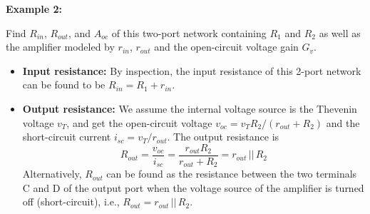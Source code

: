 \begin{itemize}
\begin{itemize}
  \begin{comment}
  The performance of such a circuit containing active components can also
  be described by terms such as ``voltage gain'' $G_V$, ``current gain'' 
  $G_I$, and ``power gain'' $G_P$, which can be found based on the specific
  circuits. They are defined as below:
  \begin{itemize}
  \item {\bf Voltage gain $G_V$:} defined as the ratio of the output 
    voltage to the source voltage:
    \[
    G_V=\frac{v_{out}}{v_s}
    =A\frac{r_{in}}{R_S+r_{in}} \frac{R_L}{R_L+r_{out}} 
    \]
    For the output of the voltage amplifier to be as high as possible,
    we would like to have ideally $r_{in}=\infty$ and $r_{out}=0$, so that
    the output voltage is maximized $v_{out}=A v_s$ and the gain is $G_V=A$.

  \item {\bf Current gain $G_I$:} defined as the ratio of the output 
    current to the input current:
    \[
    G_I=\frac{i_{out}}{i_{in}}=\frac{A v_{in}/(r_{out}+R_L)}{i_{in}}
    =\frac{A r_{in}i_{in}/(r_{out}+R_L)}{i_{in}}
    =\frac{A r_{in}}{r_{out}+R_L}
    \]
    Ideally, when $r_{in}=\infty$, $r_{out}=0$, we have $G_I=\infty$.

  \item {\bf Power gain $G_P$: } defined as the ratio of the power 
    delivered to the load to that to the amplifier:
    \[
    G_P=\frac{v_{out}^2/R_L}{v_{in}^2/r_{in}}=G_V^2 \frac{r_{in}}{R_L} 
    \]
  \end{itemize}
  \end{comment}

\end{itemize}

{\bf Example 2:} 


Find $R_{in}$, $R_{out}$, and $A_{oc}$ of this two-port network containing
$R_1$ and $R_2$ as well as the amplifier modeled by $r_{in}$, $r_{out}$ 
and the open-circuit voltage gain $G_v$. 

\begin{itemize}
\item {\bf Input resistance:} By inspection, the input resistance of this
  2-port network can be found to be $R_{in}=R_1+r_{in}$.

\item {\bf Output resistance:} We assume the internal voltage source 
  is the Thevenin voltage $v_T$, and get the open-circuit voltage 
  $v_{oc}=v_T R_2/(r_{out}+R_2)$ and the short-circuit current
  $i_{sc}=v_T/r_{out}$. The output resistance is
  \[ 
  R_{out}=\frac{v_{oc}}{i_{sc}}=\frac{r_{out}R_2}{r_{out}+R_2}=r_{out}\,||\,R_2 
  \]
  Alternatively, $R_{out}$ can be found as the resistance between the two 
  terminals C and D of the output port when the voltage source of the amplifier 
  is turned off (short-circuit), i.e., $R_{out}=r_{out}\,||\,R_2$.


\end{itemize}
\end{itemize}
